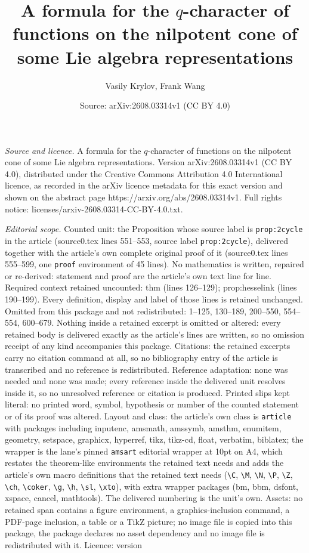 \documentclass[10pt,a4paper]{amsart}
\title[A formula for the $q$-character of functions on the nilpoten]{A formula for the $q$-character of functions on the nilpotent cone of some Lie algebra representations}
\author{Vasily Krylov, Frank Wang}
\date{Source: arXiv:2608.03314v1 (CC BY 4.0)}
\begin{document}
\maketitle

\noindent\emph{Source and licence.} A formula for the $q$-character of functions on the nilpotent cone of some Lie algebra representations. Version arXiv:2608.03314v1 (CC BY 4.0), distributed under the Creative Commons Attribution 4.0 International licence, as recorded in the arXiv licence metadata for this exact version and shown on the abstract page https://arxiv.org/abs/2608.03314v1. Full rights notice: licenses/arxiv-2608.03314-CC-BY-4.0.txt.\par\smallskip

\noindent\textit{Editorial scope.} Counted unit: the Proposition whose source label is \texttt{prop:2cycle} in the article (source0.tex lines 551--553, source label \texttt{prop:2cycle}), delivered together with the article's own complete original proof of it (source0.tex lines 555--599, one \texttt{proof} environment of 45 lines). No mathematics is written, repaired or re-derived: statement and proof are the article's own text line for line. Required context retained uncounted: thm (lines 126--129); prop:hesselink (lines 190--199). Every definition, display and label of those lines is retained unchanged. Omitted from this package and not redistributed: 1--125, 130--189, 200--550, 554--554, 600--679. Nothing inside a retained excerpt is omitted or altered: every retained body is delivered exactly as the article's lines are written, so no omission receipt of any kind accompanies this package. Citations: the retained excerpts carry no citation command at all, so no bibliography entry of the article is transcribed and no reference is redistributed. Reference adaptation: none was needed and none was made; every reference inside the delivered unit resolves inside it, so no unresolved reference or citation is produced. Printed slips kept literal: no printed word, symbol, hypothesis or number of the counted statement or of its proof was altered. Layout and class: the article's own class is \texttt{article} with packages including inputenc, amsmath, amssymb, amsthm, enumitem, geometry, setspace, graphicx, hyperref, tikz, tikz-cd, float, verbatim, biblatex; the wrapper is the lane's pinned \texttt{amsart} editorial wrapper at 10pt on A4, which restates the theorem-like environments the retained text needs and adds the article's own macro definitions that the retained text needs (\texttt{\textbackslash C}, \texttt{\textbackslash M}, \texttt{\textbackslash N}, \texttt{\textbackslash P}, \texttt{\textbackslash Z}, \texttt{\textbackslash ch}, \texttt{\textbackslash coker}, \texttt{\textbackslash g}, \texttt{\textbackslash h}, \texttt{\textbackslash sl}, \texttt{\textbackslash xto}), with extra wrapper packages (bm, bbm, dsfont, xspace, cancel, mathtools). The delivered numbering is the unit's own. Assets: no retained span contains a figure environment, a graphics-inclusion command, a PDF-page inclusion, a table or a TikZ picture; no image file is copied into this package, the package declares no asset dependency and no image file is redistributed with it. Licence: version 
\end{document}
